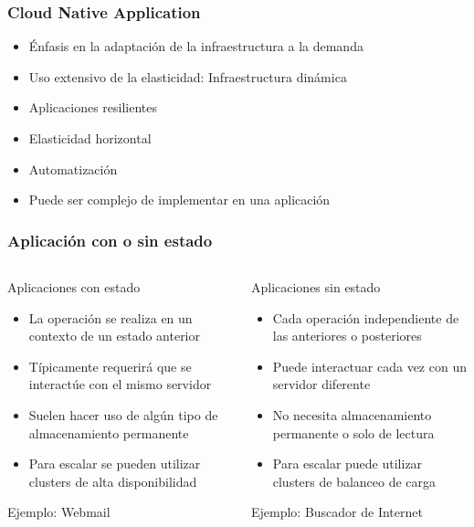 \documentclass[aspectratio=169]{beamer}
\begin{document}
\begin{frame}
  \frametitle{Cloud Native Application}
  \begin{itemize}
  \item Énfasis en la adaptación de la infraestructura a la demanda
  \item Uso extensivo de la elasticidad: Infraestructura dinámica
  \item Aplicaciones resilientes
  \item Elasticidad horizontal
  \item Automatización
  \item Puede ser complejo de implementar en una aplicación
  \end{itemize}
\end{frame}

\begin{frame}
  \frametitle{Aplicación con o sin estado}
  \begin{columns}
    \begin{block}{Aplicaciones con estado}
      \begin{itemize}
      \item La operación se realiza en un contexto de un estado anterior
      \item Típicamente requerirá que se interactúe con el mismo servidor
      \item Suelen hacer uso de algún tipo de almacenamiento permanente
      \item Para escalar se pueden utilizar clusters de alta disponibilidad
      \end{itemize}
      Ejemplo: Webmail
    \end{block}
    \begin{block}{Aplicaciones sin estado}
      \begin{itemize}
      \item Cada operación independiente de las anteriores o posteriores
      \item Puede interactuar cada vez con un servidor diferente
      \item No necesita almacenamiento permanente o solo de lectura
      \item Para escalar puede utilizar clusters de balanceo de carga
      \end{itemize}
      Ejemplo: Buscador de Internet
    \end{block}
  \end{columns}
\end{frame}
\end{document}
